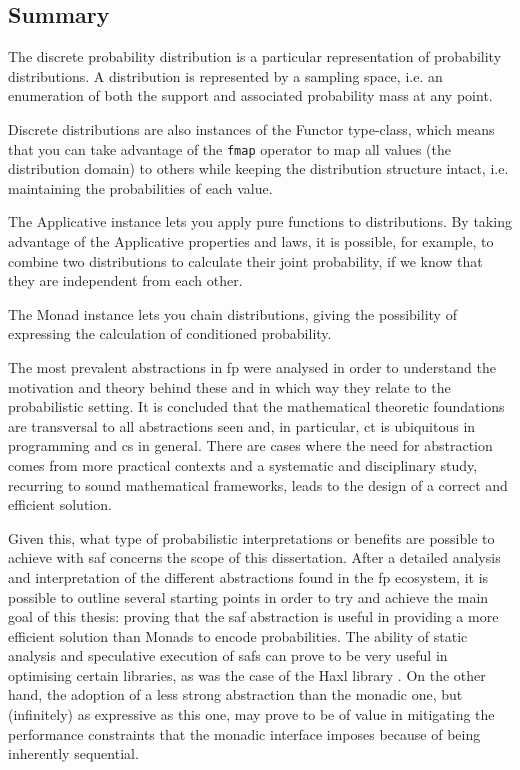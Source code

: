 \documentclass[
  oneside,
  11pt, a4paper,
  footinclude=true,
  headinclude=true,
  cleardoublepage=empty
]{scrbook}
\theoremstyle{definition}
\theoremstyle{definition}
\begin{document}
    \subsection{Summary}\label{sec-summary}
    
    The discrete probability distribution is a particular representation of probability distributions. A distribution is represented by a sampling space, i.e. an enumeration of both the support and associated probability mass at any point.
    
    Discrete distributions are also instances of the Functor type-class, which means that you can take advantage of the \texttt{fmap} operator to map all values (the distribution domain) to others while keeping the distribution structure intact, i.e. maintaining the probabilities of each value.
        
    The Applicative instance lets you apply pure functions to distributions. By taking advantage of the Applicative properties and laws, it is possible, for example, to combine two distributions to calculate their joint probability, if we know that they are independent from each other.
        
    The Monad instance lets you chain distributions, giving the possibility of expressing the calculation of conditioned probability.
    
    The most prevalent abstractions in \gls{fp} were analysed in order to understand the motivation and theory behind these and in which way they relate to the probabilistic setting. It is concluded that the mathematical theoretic foundations are transversal to all abstractions seen and, in particular, \gls{ct} is ubiquitous in programming and \gls{cs} in general. There are cases where the need for abstraction comes from more practical contexts and a systematic and disciplinary study, recurring to sound mathematical frameworks, leads to the design of a correct and efficient solution.
    
    Given this, what type of probabilistic interpretations or benefits are possible to achieve with \gls{saf} concerns the scope of this dissertation. After a detailed analysis and interpretation of the different abstractions found in the \gls{fp} ecosystem, it is possible to outline several starting points in order to try and achieve the main goal of this thesis: proving that the \gls{saf} abstraction is useful in providing a more efficient solution than Monads to encode probabilities. The ability of static analysis and speculative execution of \glspl{saf} can prove to be very useful in optimising certain libraries, as was the case of the Haxl library \citep{Marlow:2014:NFA:2692915.2628144, andrey2019selective}. On the other hand, the adoption of a less strong abstraction than the monadic one, but (infinitely) as expressive as this one, may prove to be of value in mitigating the performance constraints that the monadic interface imposes because of being inherently sequential.
	            
\end{document}

